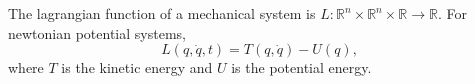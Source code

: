 The lagrangian function of a mechanical system is $L: \mathbb{R}^n \times \mathbb{R}^n \times \mathbb{R} \to \mathbb{R}$. For newtonian potential systems,
$$L(q, \dot{q}, t) = T(q, \dot{q}) - U(q),$$
where $T$ is the kinetic energy and $U$ is the potential energy.

